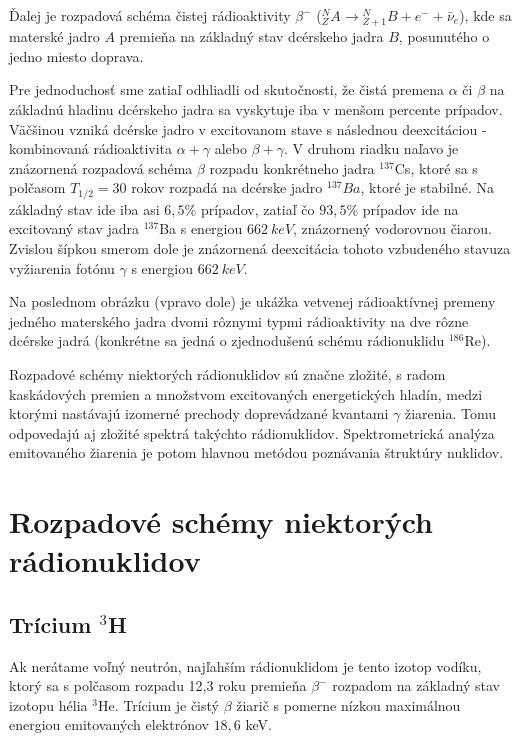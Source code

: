 \documentclass[../../main.tex]{subfiles}
\begin{document}
Ďalej je rozpadová schéma čistej rádioaktivity $\beta^-$ ($^N_ZA\rightarrow {^N_{Z+1}B} + e^- + \bar{\nu}_e$), kde sa materské jadro $A$ premieňa na základný stav dcérskeho jadra $B$, posunutého o jedno miesto doprava.

Pre jednoduchosť sme zatiaľ odhliadli od skutočnosti, že čistá premena $\alpha$ či $\beta$ na základnú hladinu dcérskeho jadra sa vyskytuje iba v menšom percente prípadov. Väčšinou vzniká dcérske jadro v excitovanom stave s následnou deexcitáciou - kombinovaná rádioaktivita $\alpha +\gamma$ alebo $\beta +\gamma$. V druhom riadku naľavo je znázornená rozpadová schéma $\beta$ rozpadu konkrétneho jadra $^{137}$Cs, ktoré sa s polčasom $T_{1/2}=30$ rokov rozpadá na dcérske jadro $^{137}Ba$, ktoré je stabilné. Na základný stav ide iba asi $6,5\%$ prípadov, zatiaľ čo $93,5\%$ prípadov ide na excitovaný stav jadra $^{137}$Ba s energiou $662\:\unit{keV}$, znázornený vodorovnou čiarou. Zvislou šípkou smerom dole je znázornená deexcitácia tohoto vzbudeného stavuza vyžiarenia fotónu $\gamma$ s energiou $662\:\unit{keV}$.

Na poslednom obrázku (vpravo dole) je ukážka vetvenej rádioaktívnej premeny jedného materského jadra dvomi rôznymi typmi rádioaktivity na dve rôzne dcérske jadrá (konkrétne sa jedná o zjednodušenú schému rádionuklidu $^{186}$Re).

Rozpadové schémy niektorých rádionuklidov sú značne zložité, s radom kaskádových premien a množstvom excitovaných energetických hladín, medzi ktorými nastávajú izomerné prechody doprevádzané kvantami $\gamma$ žiarenia. Tomu odpovedajú aj zložité spektrá takýchto rádionuklidov. Spektrometrická analýza emitovaného žiarenia je potom hlavnou metódou poznávania štruktúry nuklidov.

\section{Rozpadové schémy niektorých rádionuklidov}

\subsection{Trícium $^3$H}

Ak nerátame voľný neutrón, najľahším rádionuklidom je tento izotop vodíku, ktorý sa s polčasom rozpadu 12,3 roku premieňa $\beta^-$ rozpadom na základný stav izotopu hélia $^3$He. Trícium je čistý $\beta$ žiarič s pomerne nízkou maximálnou energiou emitovaných elektrónov $18,6$ keV.
\end{document}
